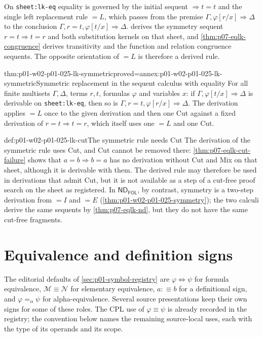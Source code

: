 On \texttt{sheet:lk-eq} equality is governed by the
initial sequent \(\Rightarrow t=t\) and the single left replacement rule \(=L\), which passes from the premise
\(\Gamma,\varphi[r/x]\Rightarrow\Delta\) to the conclusion
\(\Gamma,r=t,\varphi[t/x]\Rightarrow\Delta\).
 derives the symmetry sequent
\(r=t\Rightarrow t=r\) and both substitution kernels on that sheet, and
\cref{thm:p07-eqlk-congruence} derives transitivity and the function and
relation congruence sequents.  The opposite orientation of \(=L\) is
therefore a derived rule.

\begin{hbcorollary}{thm:p01-w02-p01-025-lk-symmetric}{proved=annex:p01-w02-p01-025-lk-symmetric}{Symmetric replacement in the sequent calculus with equality}
For all finite multisets \(\Gamma,\Delta\), terms \(r,t\), formulas
\(\varphi\) and variables \(x\): if
\(\Gamma,\varphi[t/x]\Rightarrow\Delta\) is derivable on
\texttt{sheet:lk-eq}, then so is
\(\Gamma,r=t,\varphi[r/x]\Rightarrow\Delta\).  The derivation applies \(=L\)
once to the given derivation and then one Cut against a fixed derivation of
\(r=t\Rightarrow t=r\), which itself uses one \(=L\) and one Cut.
\end{hbcorollary}

\begin{hbwarning}{def:p01-w02-p01-025-lk-cut}{The symmetric rule needs Cut}
The derivation of the symmetric rule uses Cut, and Cut cannot be removed
there: \cref{thm:p07-eqlk-cut-failure} shows that \(a=b\Rightarrow b=a\) has
no derivation without Cut and Mix on that sheet, although it is derivable
with them.  The derived rule may therefore be used in derivations that admit
Cut, but it is not available as a step of a cut-free proof search on the
sheet as registered.  In \(\mathsf{ND}_{\mathsf{FOL}}\), by contrast,
symmetry is a two-step derivation from \(=I\) and \(=E\)
(\cref{thm:p01-w02-p01-025-symmetry}); the two calculi derive the same
sequents by \cref{thm:p07-eqlk-nd}, but they do not have the same
cut-free fragments.
\end{hbwarning}

\section{Equivalence and definition signs}
\label{sec:p01-w02-p01-025-signs}

The editorial defaults of \cref{sec:p01-symbol-registry} are
\(\varphi\Leftrightarrow\psi\) for formula equivalence,
\(\mathcal M\equiv\mathcal N\) for elementary equivalence,
\(a\mathrel{:\equiv}b\) for a definitional sign, and \(\varphi=_\alpha\psi\)
for alpha-equivalence.  Several source presentations keep their own signs for
some of these roles.  The CPL use of \(\varphi\equiv\psi\) is already
recorded in the registry; the convention below names the remaining
source-local uses, each with the type of its operands and its scope.

